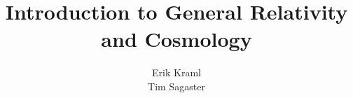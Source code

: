 \documentclass[a4paper, 11pt]{article}
\begin{document}
\title{Introduction to General Relativity and Cosmology}
\author{Erik Kraml \\ Tim Sagaster}
\maketitle
\end{document}
